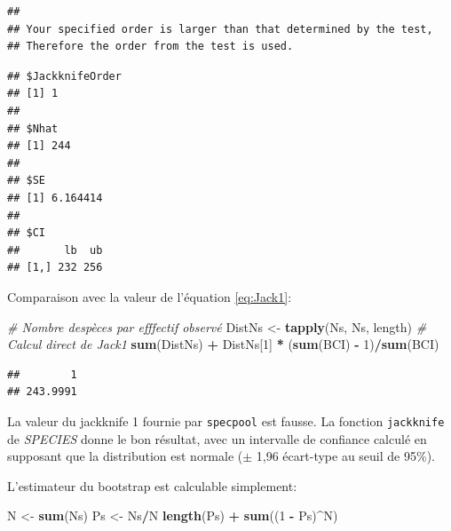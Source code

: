 \documentclass[
  11pt,
  french,
  a4paper,
  extrafontsizes,onecolumn,openright
  ]{memoir}
\newenvironment{Shaded}{\begin{snugshade}}{\end{snugshade}}
\newcommand{\CommentTok}[1]{\textcolor[rgb]{0.56,0.35,0.01}{\textit{#1}}}
\newcommand{\DecValTok}[1]{\textcolor[rgb]{0.00,0.00,0.81}{#1}}
\newcommand{\FunctionTok}[1]{\textcolor[rgb]{0.13,0.29,0.53}{\textbf{#1}}}
\newcommand{\NormalTok}[1]{#1}
\newcommand{\OtherTok}[1]{\textcolor[rgb]{0.56,0.35,0.01}{#1}}
\newcommand{\SpecialCharTok}[1]{\textcolor[rgb]{0.81,0.36,0.00}{\textbf{#1}}}
\begin{document}
\begin{verbatim}
## 
## Your specified order is larger than that determined by the test, 
## Therefore the order from the test is used.
\end{verbatim}

\begin{verbatim}
## $JackknifeOrder
## [1] 1
## 
## $Nhat
## [1] 244
## 
## $SE
## [1] 6.164414
## 
## $CI
##       lb  ub
## [1,] 232 256
\end{verbatim}

\normalsize

Comparaison avec la valeur de l'équation \eqref{eq:Jack1}:

\scriptsize

\begin{Shaded}
\begin{Highlighting}[]
\CommentTok{\# Nombre d\textquotesingle{}espèces par efffectif observé}
\NormalTok{DistNs }\OtherTok{\textless{}{-}} \FunctionTok{tapply}\NormalTok{(Ns, Ns, length)}
\CommentTok{\# Calcul direct de Jack1}
\FunctionTok{sum}\NormalTok{(DistNs) }\SpecialCharTok{+}\NormalTok{ DistNs[}\DecValTok{1}\NormalTok{] }\SpecialCharTok{*}\NormalTok{ (}\FunctionTok{sum}\NormalTok{(BCI) }\SpecialCharTok{{-}} \DecValTok{1}\NormalTok{)}\SpecialCharTok{/}\FunctionTok{sum}\NormalTok{(BCI)}
\end{Highlighting}
\end{Shaded}

\begin{verbatim}
##        1 
## 243.9991
\end{verbatim}

\normalsize

La valeur du jackknife 1 fournie par \texttt{specpool} est fausse.
La fonction \texttt{jackknife} de \emph{SPECIES} donne le bon résultat, avec un intervalle de confiance calculé en supposant que la distribution est normale (\(\pm\) 1,96 écart-type au seuil de 95\%).

L'estimateur du bootstrap est calculable simplement:

\scriptsize

\begin{Shaded}
\begin{Highlighting}[]
\NormalTok{N }\OtherTok{\textless{}{-}} \FunctionTok{sum}\NormalTok{(Ns)}
\NormalTok{Ps }\OtherTok{\textless{}{-}}\NormalTok{ Ns}\SpecialCharTok{/}\NormalTok{N}
\FunctionTok{length}\NormalTok{(Ps) }\SpecialCharTok{+} \FunctionTok{sum}\NormalTok{((}\DecValTok{1} \SpecialCharTok{{-}}\NormalTok{ Ps)}\SpecialCharTok{\^{}}\NormalTok{N)}
\end{Highlighting}
\end{Shaded}
\end{document}
